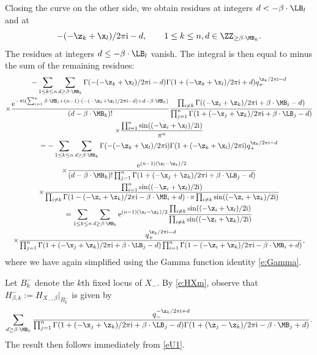 Closing the curve on the other side, we obtain residues at integers $d < -\beta \cdot \LB_l$ and at
\[
- (-\z_k+\x_l)/2 \pi {\rm i} - d,\qquad 1 \leq k \leq n, d \in \ZZ_{\geq \beta \cdot \MB_k}.
\]
The residues at integers $d \leq -\beta \cdot \LB_l$ vanish. The integral is then equal to minus the sum of the remaining residues:
\begin{gather*} %
 -\sum_{1 \leq k \leq n}
\sum_{d \geq \beta \cdot \MB_k}\Gamma(- (-\z_k+\x_l)/2 \pi {\rm i} -d) \Gamma(1 + (-\z_k+\x_l)/2 \pi {\rm i} + d) q_+^{ \z_k/2 \pi {\rm i}-d } \\ \nonumber
\times
\frac{ {\rm e}^{- \pi {\rm i} ( \sum_{i=1}^n \beta \cdot \MB_i + (n-1)\cdot ( - (-\z_k+\x_l)/2 \pi {\rm i} - d)+d- \beta \cdot \MB_k)}}{(d - \beta \cdot \MB_k)!}\frac{\prod_{i\neq k} \Gamma((-\z_i + \z_k)/2 \pi {\rm i} + \beta \cdot \MB_i -d)}
{\prod_{j=1}^n \Gamma(1 + (- \x_j+\z_k)/2 \pi {\rm i} + \beta \cdot \LB_j -d) }\\ \nonumber
\times
 \frac{ \prod_{i=1}^n \sin( (-\z_i+\x_l)/2 {\rm i}) }{\pi^n}
 \\ \nonumber
= -\sum_{1 \leq k \leq n}
\sum_{d \geq \beta \cdot \MB_k}\Gamma(- (-\z_k+\x_l)/2 \pi {\rm i} ) \Gamma(1 + (-\z_k+\x_l)/2 \pi {\rm i}) q_+^{ \z_k/2 \pi {\rm i}-d } \\ \nonumber
\times
\frac{ {\rm e}^{ (n-1) ( \x_l-\z_k)/2}}
{(d - \beta \cdot \MB_k)!\prod_{j=1}^n \Gamma(1 + (- \x_j+\z_k)/2 \pi {\rm i} + \beta \cdot \LB_j -d) }\\ \nonumber
\times
 \frac{ \prod_{i=1}^n \sin( (-\z_i+\x_l)/2 {\rm i}) }{\prod_{i \neq k} \Gamma(1 - (-\z_i +\z_k)/2 \pi {\rm i} - \beta \cdot \MB_i + d) \cdot \pi \prod_{i \neq k}\sin((-\z_i + \z_k)/2 {\rm i})}
\\ \nonumber
 = \sum_{1 \leq k \leq n}
\sum_{d \geq \beta \cdot \MB_k} {\rm e}^{ (n-1) ( \x_l-\z_k)/2}\frac{ \prod_{i\neq k} \sin( (-\z_i+\x_l)/2 {\rm i}) }{\prod_{i \neq k}\sin((-\z_i + \z_k)/2 {\rm i})} \\
\times
\frac{q_+^{ \z_k/2 \pi {\rm i}-d } }
{\prod_{j=1}^n \Gamma(1 + (- \x_j+\z_k)/2 \pi {\rm i} + \beta \cdot \LB_j -d) \prod_{i =1}^n \Gamma(1 - (-\z_i +\z_k)/2 \pi {\rm i} - \beta \cdot \MB_i + d)}, \nonumber
\end{gather*}
where we have again simplified using the Gamma function identity \eqref{e:Gamma}.

Let $B_k^{-}$ denote the $k$th fixed locus of $X_{-}$. By \eqref{e:HXm}, observe
that $H_{\beta, k}^{-} := H_{X_{-}, \beta}|_{B_k^{-}}$ is given by
\[
\sum_{d \geq \beta \cdot \MB_k} \frac{ q_-^{-\z_k/2 \pi {\rm i}+d}}
{\prod_{j=1}^n \Gamma(1 + (- \x_j +\z_k)/2 \pi {\rm i} + \beta \cdot \LB_j-d)\Gamma(1 + (\z_j -\z_k)/2 \pi {\rm i} - \beta \cdot \MB_j + d)}.
\]
The result then follows immediately from \eqref{eU1}.

